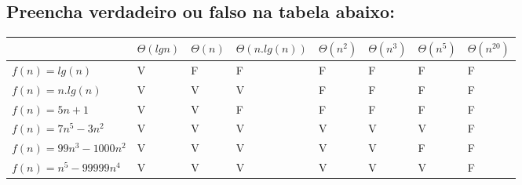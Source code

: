 \documentclass[12pt]{article}
\begin{document}
{\subsection{Preencha verdadeiro ou falso na tabela abaixo:}
\begin{table}[htb]
    \begin{tabular}{|l|l|l|l|l|l|l|l|} \hline
                              & $\Theta(lg n)$ & $\Theta(n)$ & $\Theta(n.lg(n))$ & $\Theta(n^2)$ & $\Theta(n^3)$ & $\Theta(n^5)$ & $\Theta(n^20)$ \\ \hline
    $f(n) = lg(n)$            & V              & F           & F                 & F             & F             & F             & F              \\ \hline
    $f(n) = n . lg(n)$        & V              & V           & V                 & F             & F             & F             & F              \\ \hline
    $f(n) = 5n + 1$           & V              & V           & F                 & F             & F             & F             & F              \\ \hline
    $f(n) = 7n^5 - 3n^2$      & V              & V           & V                 & V             & V             & V             & F              \\ \hline
    $f(n) = 99n^3 - 1000n^2$  & V              & V           & V                 & V             & V             & F             & F              \\ \hline
    $f(n) = n^5 - 99999n^4$   & V              & V           & V                 & V             & V             & V             & F              \\ \hline
    \end{tabular}
\end{table}

}
\end{document}

